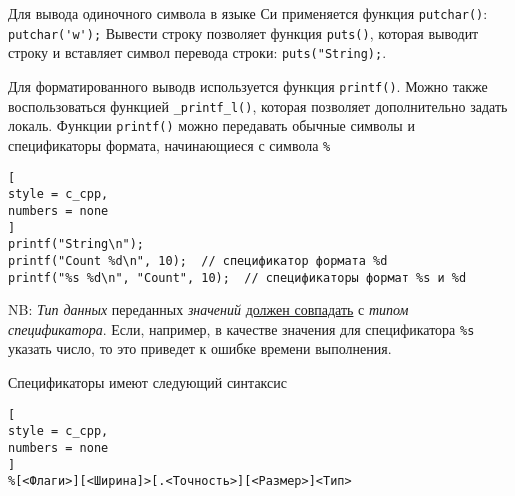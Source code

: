 \documentclass[%
	11pt,
	a4paper,
	utf8,
		]{article}
\begin{document}
Для вывода одиночного символа в языке Си применяется функция \verb*|putchar()|: \verb|putchar('w');| Вывести строку позволяет функция \verb*|puts()|, которая выводит строку и вставляет символ перевода строки: \verb|puts("String);|.

Для форматированного выводв используется функция \verb*|printf()|. Можно также воспользоваться функцией \verb|_printf_l()|, которая позволяет дополнительно задать локаль. Функции \verb*|printf()| можно передавать обычные символы и спецификаторы формата, начинающиеся с символа \verb|%|
\begin{lstlisting}[
style = c_cpp,
numbers = none	
]
printf("String\n");
printf("Count %d\n", 10);  // спецификатор формата %d
printf("%s %d\n", "Count", 10);  // спецификаторы формат %s и %d
\end{lstlisting}

NB: \emph{Тип данных} переданных \emph{значений} \underline{должен совпадать} с \emph{типом спецификатора}. Если, например, в качестве значения для спецификатора \verb*|%s| указать число, то это приведет к ошибке времени выполнения.

Спецификаторы имеют следующий синтаксис \cite[]{prokhorenok-prog-c:2020}
\begin{lstlisting}[
style = c_cpp,
numbers = none
]
%[<Флаги>][<Ширина]>[.<Точность>][<Размер>]<Тип>
\end{lstlisting}
\end{document}
